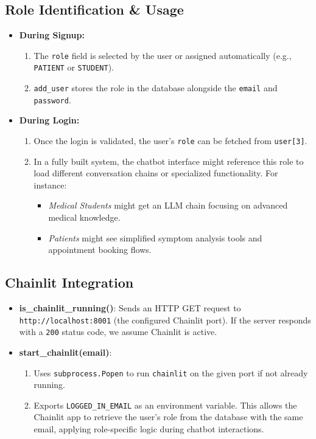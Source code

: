 \subsection{Role Identification \& Usage}
\begin{itemize}
  \item \textbf{During Signup:} 
  \begin{enumerate}
    \item The \texttt{role} field is selected by the user or assigned automatically (e.g., \texttt{PATIENT} or \texttt{STUDENT}).
    \item \texttt{add\_user} stores the role in the database alongside the \texttt{email} and \texttt{password}.
  \end{enumerate}
  \item \textbf{During Login:}
  \begin{enumerate}
    \item Once the login is validated, the user’s \texttt{role} can be fetched from \texttt{user[3]}. 
    \item In a fully built system, the chatbot interface might reference this role to load different conversation chains
          or specialized functionality. For instance:
          \begin{itemize}
            \item \emph{Medical Students} might get an LLM chain focusing on advanced medical knowledge.
            \item \emph{Patients} might see simplified symptom analysis tools and appointment booking flows.
          \end{itemize}
  \end{enumerate}
\end{itemize}

\subsection{Chainlit Integration}
\label{subsec:chainlit}
\begin{itemize}
  \item \textbf{is\_chainlit\_running()}: Sends an HTTP GET request to \texttt{http://localhost:8001} (the configured Chainlit port).
        If the server responds with a \texttt{200} status code, we assume Chainlit is active.
  \item \textbf{start\_chainlit(email)}: 
        \begin{enumerate}
            \item Uses \texttt{subprocess.Popen} to run \texttt{chainlit} on the given port if not already running.
            \item Exports \texttt{LOGGED\_IN\_EMAIL} as an environment variable. 
                  This allows the Chainlit app to retrieve the user’s role from the database with the same email,
                  applying role-specific logic during chatbot interactions.
        \end{enumerate}
\end{itemize}

